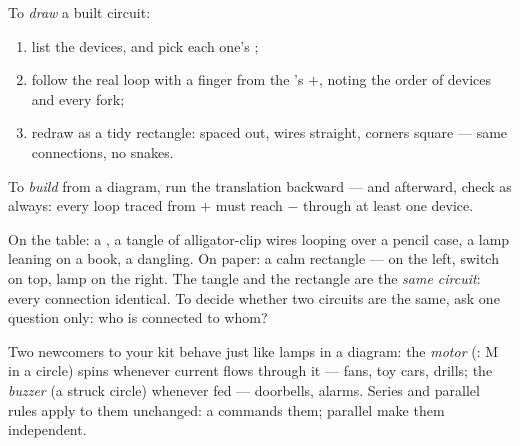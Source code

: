 \begin{method}\label{met:g6:circuits-and-safety:translate}
To \emph{draw} a built circuit:
\begin{enumerate}
  \item list the devices, and pick each one's ;
  \item follow the real loop with a finger from the 's $+$,
        noting the order of devices and every fork;
  \item redraw as a tidy rectangle:  spaced out, wires
        straight, corners square --- same connections, no snakes.
\end{enumerate}
To \emph{build} from a diagram, run the translation backward ---
and afterward, check as always: every loop traced from $+$ must
reach $-$ through at least one device.
\end{method}

\begin{example}\label{ex:g6:circuits-and-safety:portraits}
On the table: a , a tangle of alligator-clip wires looping
over a pencil case, a lamp leaning on a book, a  dangling.
On paper: a calm rectangle ---  on the left, switch on top,
lamp on the right. The tangle and the rectangle are the \emph{same
circuit}: every connection identical. To decide whether two
circuits are the same, ask one question only: who is connected to
whom?
\end{example}

\begin{example}\label{ex:g6:circuits-and-safety:motor}
Two newcomers to your kit behave just like lamps in a diagram: the
\emph{motor} (: M in a circle) spins whenever
current flows through it --- fans, toy cars, drills; the
\emph{buzzer} (a struck circle)  whenever fed
--- doorbells, alarms. Series and parallel rules apply to them
unchanged: a   commands them; parallel 
make them independent.
\end{example}

